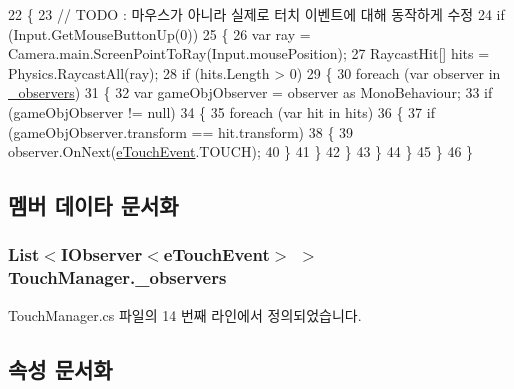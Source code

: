 \begin{DoxyCode}
22     \{
23         \textcolor{comment}{// TODO : 마우스가 아니라 실제로 터치 이벤트에 대해 동작하게 수정}
24         \textcolor{keywordflow}{if} (Input.GetMouseButtonUp(0))
25         \{
26             var ray = Camera.main.ScreenPointToRay(Input.mousePosition);
27             RaycastHit[] hits = Physics.RaycastAll(ray);
28             \textcolor{keywordflow}{if} (hits.Length > 0)
29             \{
30                 \textcolor{keywordflow}{foreach} (var observer \textcolor{keywordflow}{in} \hyperlink{class_touch_manager_a90d8ccdafc722f2d17dd0c7c818631c4}{\_observers})
31                 \{
32                     var gameObjObserver = observer as MonoBehaviour;
33                     \textcolor{keywordflow}{if} (gameObjObserver != null)
34                     \{
35                         \textcolor{keywordflow}{foreach} (var hit \textcolor{keywordflow}{in} hits)
36                         \{
37                             \textcolor{keywordflow}{if} (gameObjObserver.transform == hit.transform)
38                             \{
39                                 observer.OnNext(\hyperlink{_touch_manager_8cs_ae33e321a424fe84ba8b2fdb81ad40a68}{eTouchEvent}.TOUCH);
40                             \}
41                         \}
42                     \}
43                 \}
44             \}
45         \}
46     \}
\end{DoxyCode}


\subsection{멤버 데이타 문서화}
\subsubsection[{\texorpdfstring{\+\_\+observers}{_observers}}]{\setlength{\rightskip}{0pt plus 5cm}List$<${\bf I\+Observer}$<${\bf e\+Touch\+Event}$>$ $>$ Touch\+Manager.\+\_\+observers\hspace{0.3cm}{\ttfamily [private]}}\hypertarget{class_touch_manager_a90d8ccdafc722f2d17dd0c7c818631c4}{}\label{class_touch_manager_a90d8ccdafc722f2d17dd0c7c818631c4}


Touch\+Manager.\+cs 파일의 14 번째 라인에서 정의되었습니다.



\subsection{속성 문서화}
